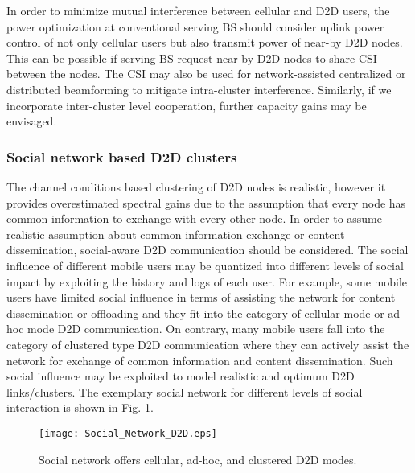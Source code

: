 \documentclass[article,10pt,twocolumn]{IEEEtran}
\begin{document}
In order to minimize mutual interference between cellular and D2D users, the power optimization at conventional serving BS should consider uplink power control of not only cellular users but also transmit power of near-by D2D nodes. This can be possible if serving BS request near-by D2D nodes to share CSI between the nodes. The CSI may also be used for network-assisted centralized or distributed beamforming to mitigate intra-cluster interference. Similarly, if we incorporate inter-cluster level cooperation, further capacity gains may be envisaged.
\subsubsection{Social network based D2D clusters}\label{ss:snbd2dc}
The channel conditions based clustering of D2D nodes is realistic, however it provides overestimated spectral gains due to the assumption that every node has common information to exchange with every other node. In order to assume realistic assumption about common information exchange or content dissemination, social-aware D2D communication should be considered. The social influence of different mobile users may be quantized into different levels of social impact by exploiting the history and logs of each user. For example, some mobile users have limited social influence in terms of assisting the network for content dissemination or offloading and they fit into the category of cellular mode or ad-hoc mode D2D communication. On contrary, many mobile users fall into the category of clustered type D2D communication where they can actively assist the network for exchange of common information and content dissemination. Such social influence may be exploited to model realistic and optimum D2D links/clusters. The exemplary social network for different levels of social interaction is shown in Fig. \ref{Figure:socialnetworkd2d}.
\begin{figure}[!htb]
\centering
\texttt{[image: Social\_Network\_D2D.eps]}
\caption{Social network offers cellular, ad-hoc, and clustered D2D modes.}\label{Figure:socialnetworkd2d}
\end{figure}
\end{document}
